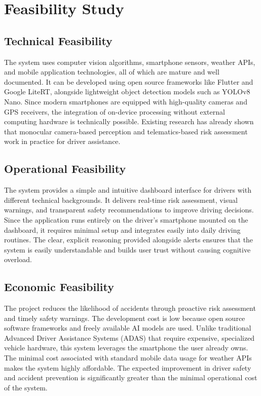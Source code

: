 \section{Feasibility Study}

\subsection{Technical Feasibility}
The system uses computer vision algorithms, smartphone sensors, weather APIs, and mobile application technologies, all of which are mature and well documented. It can be developed using open source frameworks like Flutter and Google LiteRT, alongside lightweight object detection models such as YOLOv8 Nano. Since modern smartphones are equipped with high-quality cameras and GPS receivers, the integration of on-device processing without external computing hardware is technically possible. Existing research has already shown that monocular camera-based perception and telematics-based risk assessment work in practice for driver assistance.

\subsection{Operational Feasibility}
The system provides a simple and intuitive dashboard interface for drivers with different technical backgrounds. It delivers real-time risk assessment, visual warnings, and transparent safety recommendations to improve driving decisions. Since the application runs entirely on the driver's smartphone mounted on the dashboard, it requires minimal setup and integrates easily into daily driving routines. The clear, explicit reasoning provided alongside alerts ensures that the system is easily understandable and builds user trust without causing cognitive overload.

\subsection{Economic Feasibility}
The project reduces the likelihood of accidents through proactive risk assessment and timely safety warnings. The development cost is low because open source software frameworks and freely available AI models are used. Unlike traditional Advanced Driver Assistance Systems (ADAS) that require expensive, specialized vehicle hardware, this system leverages the smartphone the user already owns. The minimal cost associated with standard mobile data usage for weather APIs makes the system highly affordable. The expected improvement in driver safety and accident prevention is significantly greater than the minimal operational cost of the system.

